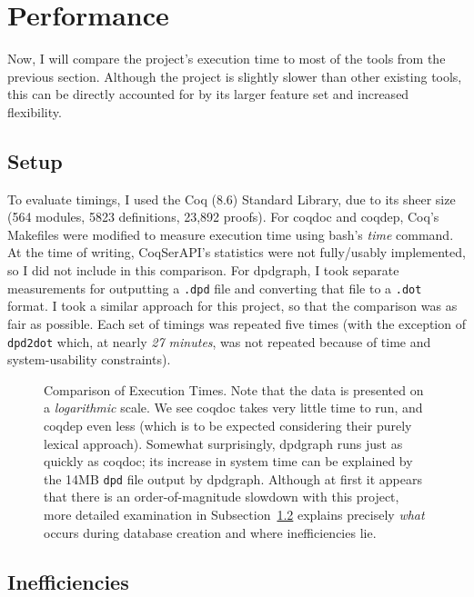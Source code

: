 \section{Performance}

Now, I will compare the project's execution time to most of the tools from the
previous section. Although the project is slightly slower than other existing
tools, this can be directly accounted for by its larger feature set and
increased flexibility.

\subsection{Setup}

To evaluate timings, I used the Coq (8.6) Standard Library, due to its sheer
size (564 modules, 5823 definitions, 23,892 proofs). For coqdoc and coqdep,
Coq's Makefiles were modified to measure execution time using bash's
\emph{time} command. At the time of writing, CoqSerAPI's statistics were not
fully/usably implemented, so I did not include in this comparison. For
dpdgraph, I took separate measurements for outputting a \texttt{.dpd} file and
converting that file to a \texttt{.dot} format. I took a similar approach for
this project, so that the comparison was as fair as possible. Each set of
timings was repeated five times (with the exception of \texttt{dpd2dot} which,
at nearly \emph{27 minutes}, was not repeated because of time and
system-usability constraints).

\begin{figure}[tp]
\centering

\caption{Comparison of Execution Times. Note that the data is presented on a
  \emph{logarithmic} scale. We see coqdoc takes very little time to run, and
  coqdep even less (which is to be expected considering their purely lexical
  approach). Somewhat surprisingly, dpdgraph runs just as quickly as coqdoc;
  its increase in system time can be explained by the 14MB \texttt{dpd} file
  output by dpdgraph. Although at first it appears that there is an
  order-of-magnitude slowdown with this project, more detailed examination in
  Subsection~\ref{subsec:ineff} explains precisely \emph{what} occurs during
  database creation and where inefficiencies lie.}\label{fig:exectimes}
\end{figure}

\subsection{Inefficiencies}\label{subsec:ineff}

